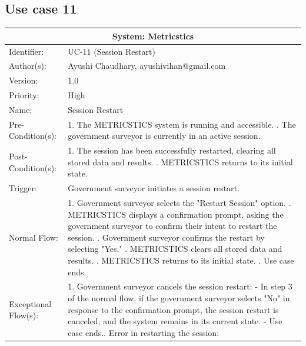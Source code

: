 \begin{table}[h]
\subsection*{Use case 11}
\begin{tabular}{ | p{4cm} | p{10cm} | }
 \hline
 \multicolumn{2}{|c|}{System: Metricstics} \\
 \hline
 Identifier: & UC-11 (Session Restart) \\
 \hline
 Author(s): & Ayushi Chaudhary, ayushivihan@gmail.com    \\
 \hline
 Version: & 1.0	\\
 \hline
 Priority: & High	\\
 \hline
 Name: & Session Restart \\
 \hline
 Pre-Condition(s):  & {1. The METRICSTICS system is running and accessible. \newline 2. The government surveyor is currently in an active session.  }\\
 \hline
 Post-Condition(s):  & {1. The session has been successfully restarted, clearing all stored data and results. \newline 2. METRICSTICS returns to its initial state.   }\\
 \hline
 Trigger: & Government surveyor initiates a session restart.  \\
 \hline
 Normal Flow:  & {1. Government surveyor selects the "Restart Session" option. \newline 2. METRICSTICS displays a confirmation prompt, asking the government surveyor to confirm their intent to restart the session. \newline 3. Government surveyor confirms the restart by selecting "Yes." \newline 4. METRICSTICS clears all stored data and results. \newline 5. METRICSTICS returns to its initial state. \newline 6. Use case ends.}\\
 \hline
 Exceptional Flow(s):  & {1. Government surveyor cancels the session restart: \newline
   - In step 3 of the normal flow, if the government surveyor selects "No" in response to the confirmation prompt, the session restart is canceled, and the system remains in its current state.\newline
   - Use case ends.\newline
   2. Error in restarting the session: \newline
}
\end{tabular}
\end{table}
